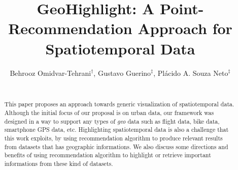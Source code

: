 \documentclass{sig-alternate-05-2015}
\begin{document}




\newtheorem{problem}{Problem}
\newtheorem{definition}{Definition}

 





\title{GeoHighlight: A Point-Recommendation Approach for Spatiotemporal Data}



\author{
Behrooz Omidvar-Tehrani$^{\dag}$, Gustavo Guerino$^{\ddag}$, Pl\'acido A. Souza Neto$^{\ddag}$\\
\\
}


\maketitle
\begin{abstract}

This paper proposes an approach towards generic visualization of
spatiotemporal data. Although the initial focus of our proposal is on urban
data, our framework was designed in a way to support any types of
\textit{geo} data such as flight data, bike data, smartphone GPS data, etc.
Highlighting spatiotemporal data is also a challenge that this work exploits, by using
recommendation algorithm to produce relevant results from datasets that has
geographic informations. We also discuss some directions and benefits of using
recommendation algorithm to highlight or retrieve important informations from
these kind of datasets.

\end{abstract}








% 




 
\end{document}
